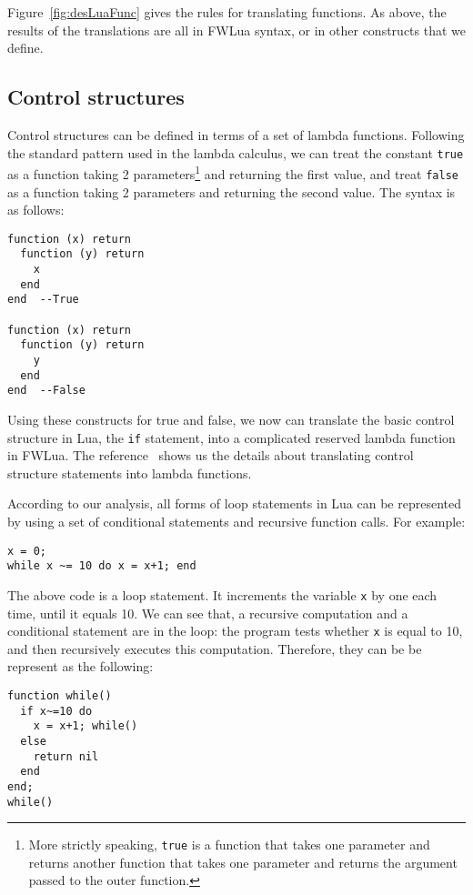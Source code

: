 Figure~\ref{fig:desLuaFunc} gives the rules for translating functions. As above, the results of the translations are all in FWLua syntax, or in other constructs that we define.

\subsection{Control structures}
Control structures can be defined in terms of a set of lambda functions. 
Following the standard pattern used in the lambda calculus,
we can treat the constant {\tt true} as a function taking 2 parameters\footnote{
  More strictly speaking, {\tt true} is a function that takes one parameter
  and returns another function that takes one parameter and returns
  the argument passed to the outer function.
}
and returning the first value, and treat {\tt false} as a function taking 2 parameters and returning the second value. The syntax is as follows:

\begin{verbatim}
function (x) return 
  function (y) return 
    x
  end
end  --True

function (x) return 
  function (y) return 
    y
  end
end  --False
\end{verbatim}

Using these constructs for true and false, we now can translate the basic control structure in Lua, the {\tt if} statement, into a complicated reserved lambda function in FWLua. The reference~\cite{TAPL} shows us the details about translating control structure statements into lambda functions.

According to our analysis, all forms of loop statements in Lua can be represented by using a set of conditional statements and recursive function calls. For example:

\begin{verbatim}
x = 0;
while x ~= 10 do x = x+1; end
\end{verbatim}

The above code is a loop statement. It increments the variable {\tt x} by one each time, until it equals 10. We can see that, a recursive computation and a conditional statement are in the loop: the program tests whether {\tt x} is equal to 10, and then recursively executes this computation. Therefore, they can be be represent as the following:

\begin{verbatim}
function while()
  if x~=10 do
    x = x+1; while()
  else
    return nil
  end
end;
while()
\end{verbatim}


